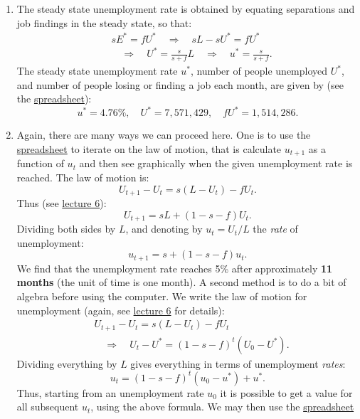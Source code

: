 \documentclass[]{book}
\theoremstyle{definition}
\theoremstyle{definition}
\theoremstyle{definition}
\theoremstyle{remark}
\begin{document}
\begin{enumerate}
\def\labelenumi{\arabic{enumi}.}
\item
  The steady state unemployment rate is obtained by equating separations
  and job findings in the steady state, so that: \[
  \begin{aligned}
  &s E^{*} = f U^{*} \quad \Rightarrow \quad sL - s U^{*} = fU^{*}\\
  &\quad \Rightarrow \quad U^{*}=\frac{s}{s+f}L \quad \Rightarrow \quad u^{*}=\frac{s}{s+f}.
  \end{aligned}
  \] The steady state unemployment rate \(u^{*}\), number of people
  unemployed \(U^{*}\), and number of people losing or finding a job
  each month, are given by (see the
  \href{https://docs.google.com/spreadsheets/d/1h9JJD8K2_IE166gdj78waf0zu4YDY9Rp3r5oiJR_06s/edit?usp=sharing}{spreadsheet}):
  \[u^{*}=4.76\%, \quad U^{*}=7,571,429, \quad f U^{*} = 1,514,286.\]
\item
  Again, there are many ways we can proceed here. One is to use the
  \href{https://docs.google.com/spreadsheets/d/1h9JJD8K2_IE166gdj78waf0zu4YDY9Rp3r5oiJR_06s/edit?usp=sharing}{spreadsheet}
  to iterate on the law of motion, that is calculate \(u_{t+1}\) as a
  function of \(u_t\) and then see graphically when the given
  unemployment rate is reached. The law of motion is:
  \[U_{t+1}-U_t = s(L-U_t) -f U_t.\] Thus (see
  \protect\hyperlink{labor-market}{lecture 6}):
  \[U_{t+1}=sL + \left(1-s-f\right)U_t.\] Dividing both sides by \(L\),
  and denoting by \(u_{t}=U_t/L\) the \emph{rate} of unemployment:
  \[u_{t+1}=s+\left(1-s-f\right)u_t.\] We find that the unemployment
  rate reaches 5\% after approximately \textbf{11 months} (the unit of
  time is one month). A second method is to do a bit of algebra before
  using the computer. We write the law of motion for unemployment
  (again, see \protect\hyperlink{labor-market}{lecture 6} for details):
  \[\begin{aligned}
  &U_{t+1}-U_t = s(L-U_t) -f U_t \\
  & \quad \Rightarrow \quad U_{t}-U^{*}=(1-s-f)^t\left(U_0-U^{*}\right).
  \end{aligned}\] Dividing everything by \(L\) gives everything in terms
  of unemployment \emph{rates}:
  \[u_{t}=(1-s-f)^t\left(u_0-u^{*}\right) + u^{*}.\] Thus, starting from
  an unemployment rate \(u_0\) it is possible to get a value for all
  subsequent \(u_t\), using the above formula. We may then use the
  \href{https://docs.google.com/spreadsheets/d/1h9JJD8K2_IE166gdj78waf0zu4YDY9Rp3r5oiJR_06s/edit?usp=sharing}{spreadsheet}

\end{enumerate}
\end{document}
